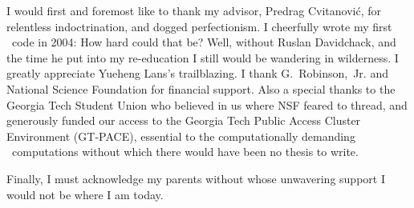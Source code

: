 
I would first and foremost like to thank my advisor, Predrag Cvitanovi\'c,
for
	          {relentless indoctrination},
and dogged perfectionism.
%
I cheerfully wrote my first \KS\ code in 2004:
How hard could that be?
Well, without Ruslan Davidchack,
 and the time he put into my re-education
I still would be wandering in wilderness.
I greatly appreciate
Yueheng Lans's trailblazing.
%
I thank
G.~Robinson,~Jr. and National Science Foundation for financial support.
%
Also a special thanks to the Georgia Tech Student Union
who believed in us where NSF feared to thread,
and generously funded our access
to the Georgia Tech Public Access Cluster Environment (GT-PACE),
essential to the
computationally demanding \KS\ computations
without which there would have been no thesis to write.

Finally, I must acknowledge my parents without whose unwavering support
I would not be where I am today.
